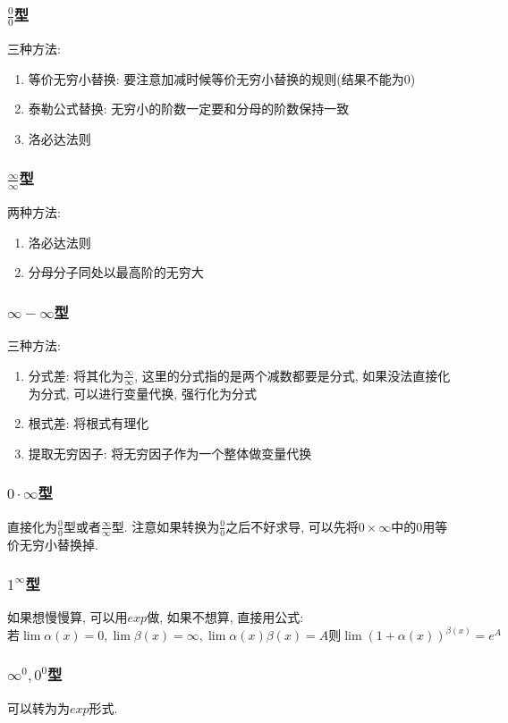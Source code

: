 \subsubsection{$ \frac{0}{0} $型}
三种方法:
\begin{enumerate}
\item 等价无穷小替换: 要注意加减时候等价无穷小替换的规则(结果不能为$ 0 $)
\item 泰勒公式替换: 无穷小的阶数一定要和分母的阶数保持一致
\item 洛必达法则
\end{enumerate}
\subsubsection{$ \frac{\infty}{\infty} $型}
两种方法:
\begin{enumerate}
\item 洛必达法则
\item 分母分子同处以最高阶的无穷大
\end{enumerate}
\subsubsection{$ \infty-\infty $型}
三种方法:
\begin{enumerate}
\item 分式差: 将其化为$ \frac{\infty}{\infty} $, 这里的分式指的是两个减数都要是分式, 如果没法直接化为分式, 可以进行变量代换, 强行化为分式
\item 根式差: 将根式有理化
\item 提取无穷因子: 将无穷因子作为一个整体做变量代换
\end{enumerate}
\subsubsection{$ 0\cdot \infty $型}
直接化为$ \frac{0}{0} $型或者$ \frac{\infty}{\infty} $型. 注意如果转换为$ \frac{0}{0} $之后不好求导, 可以先将$ 0\times \infty $中的$ 0 $用等价无穷小替换掉.
\subsubsection{$ 1^{\infty} $型}
如果想慢慢算, 可以用$ exp $做, 如果不想算, 直接用公式:
\begin{equation*}
\text{若}\lim\limits \alpha(x)=0, \lim\limits \beta(x)=\infty, \lim\limits \alpha(x)\beta(x)=A \text{则}\lim\limits (1+\alpha(x))^{\beta(x)}=e^{A}
\end{equation*}
\subsubsection{$ \infty^{0}, 0^{0} $型}
可以转为为$ exp $形式.
